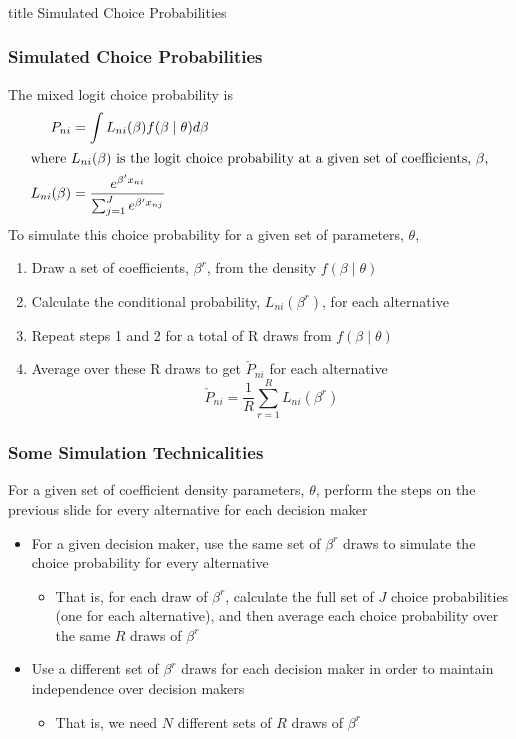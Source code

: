 \documentclass{beamer}
\begin{document}
\begin{frame}\frametitle{}
    \vfill
    \centering
    \begin{beamercolorbox}[center]{title}
        \Large Simulated Choice Probabilities
    \end{beamercolorbox}
    \vfill
\end{frame}

\begin{frame}\frametitle{Simulated Choice Probabilities}
    The mixed logit choice probability is
    \begin{align*}
        P_{ni} &= \int L_{ni}(\beta) f(\beta \mid \theta) d \beta \\
        \intertext{where $L_{ni}(\beta)$ is the logit choice probability at a given set of coefficients, $\beta$,}
        L_{ni}(\beta) &= \frac{e^{\beta' x_{ni}}}{\sum_{j = 1}^J e^{\beta' x_{nj}}}
    \end{align*}
    To simulate this choice probability for a given set of parameters, $\theta$,
    \begin{enumerate}
        \item Draw a set of coefficients, $\beta^r$, from the density $f(\beta \mid \theta)$
        \item Calculate the conditional probability, $L_{ni}(\beta^r)$, for each alternative
        \item Repeat steps 1 and 2 for a total of R draws from $f(\beta \mid \theta)$
        \item Average over these R draws to get $\check{P}_{ni}$ for each alternative
        $$\check{P}_{ni} = \frac{1}{R} \sum_{r = 1}^R L_{ni}(\beta^r)$$
    \end{enumerate}
\end{frame}

\begin{frame}\frametitle{Some Simulation Technicalities}
    For a given set of coefficient density parameters, $\theta$, perform the steps on the previous slide for every alternative for each decision maker
    \begin{itemize}
        \item For a given decision maker, use the same set of $\beta^r$ draws to simulate the choice probability for every alternative
        \begin{itemize}
            \item That is, for each draw of $\beta^r$, calculate the full set of $J$ choice probabilities (one for each alternative), and then average each choice probability over the same $R$ draws of $\beta^r$
        \end{itemize}
        \item Use a different set of $\beta^r$ draws for each decision maker in order to maintain independence over decision makers
        \begin{itemize}
            \item That is, we need $N$ different sets of $R$ draws of $\beta^r$
        \end{itemize}
    \end{itemize}
\end{frame}
\end{document}
